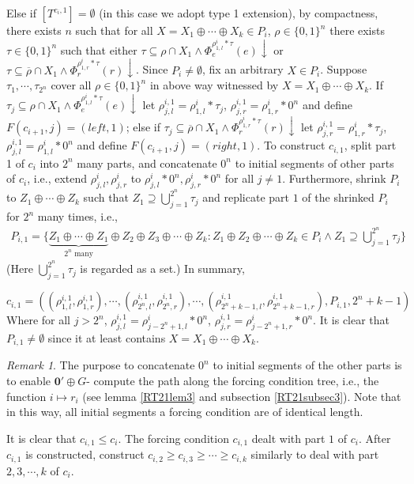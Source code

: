 \documentclass[options]{amsart}
\theoremstyle{definition}
\theoremstyle{remark}
\newtheorem{remark}[theorem]{Remark}
\newtheorem{Ramsey's theorem}[theorem]{Ramsey's theorem}
\begin{document}
Else if
$[T^{c_i,1}]=\emptyset$
(in this case we adopt type 1 extension),
by compactness, there exists
$n$ such that for all
$X= X_1\oplus\cdots\oplus
X_k\in P_i$,
$\rho\in \{0,1\}^n$ there exists
$\tau\in\{0,1\}^n$ such that
either $\tau\subseteq\rho\cap X_1\wedge
\Phi_e^{\rho^i_{1,l}*\tau}(e)\downarrow$ or $
\tau\subseteq \overline{\rho}\cap X_1\wedge
\Phi_r^{\rho^i_{1,r}*\tau}(r)\downarrow$.
Since $P_i\ne \emptyset$,
fix an arbitrary $X\in P_i$.
Suppose $\tau_1,\cdots, \tau_{2^n}$
cover all $\rho\in \{0,1\}^n$ in above way
witnessed by $X=X_1\oplus\cdots\oplus X_k$.
If $\tau_j\subseteq\rho\cap X_1\wedge
\Phi_e^{\rho^i_{1,l}*\tau}(e)\downarrow$
let $\rho^{i,1}_{j,l} =
\rho^i_{1,l}*\tau_j $,
$\rho^{i,1}_{j,r} =
\rho^i_{1,r}*0^n$
and define
$F(c_{i+1},j) =
(left, 1)$;
else if
$
\tau_j\subseteq \overline{\rho}\cap X_1\wedge
\Phi_r^{\rho^i_{1,r}*\tau}(r)\downarrow$
let $\rho^{i,1}_{j,r}
=\rho^i_{1,r}*\tau_j$,
$\rho^{i,1}_{j,l} =
\rho^i_{1,l}*0^n$
and define
$F(c_{i+1},j) =
(right, 1)$.
To construct $c_{i,1}$, split
part 1 of $c_i$ into
$2^n$ many parts, and concatenate
$0^n$ to
initial segments of other parts
of $c_i$, i.e.,
 extend $\rho^i_{j,l},\rho^i_{j,r}$
to $\rho^i_{j,l}*0^n, \rho^i_{j,r}*0^n$
for all $j\neq 1$.
Furthermore, shrink $P_i$
to $Z_1\oplus \cdots \oplus Z_k$ such
that $Z_1\supseteq \bigcup\limits_{j=1}
^{2^n}\tau_j$ and replicate
part $1$  of the shrinked
$P_i$ for $2^n$ many
times, i.e.,
\begin{align}
P_{i,1} = \{
\underbrace{Z_1\oplus\cdots
\oplus Z_1}\limits_{2^n\text{ many}}
\oplus Z_2\oplus Z_3\oplus\cdots
\oplus Z_k:
Z_1\oplus Z_2\oplus\cdots\oplus
Z_k\in P_i\wedge
Z_1\supseteq
\bigcup\limits_{j=1}^{2^n}
\tau_{j}
\}
\end{align}
(Here $\bigcup\limits_{j=1}^{2^n}
\tau_j$ is regarded as a set.)
In summary,

$$c_{i,1} =
((\rho^{i,1}_{1,l},
\rho^{i,1}_{1,r}),\cdots,
(\rho^{i,1}_{2^n,l},
\rho^{i,1}_{2^n,r}),
\cdots,(\rho^{i,1}_{2^n+k-1,l},
\rho^{i,1}_{2^n+k-1,r}),
P_{i,1}, 2^n+k-1)$$
Where for all $j>2^n$,
$\rho^{i,1}_{j,l}
=\rho^{i}_{j-2^n+1,l}*0^n$,
$\rho^{i,1}_{j,r}
=\rho^i_{j-2^n+1,r}*0^n$.
It is clear that
$P_{i,1}\ne\emptyset$
since it at least
contains $X=X_1\oplus\cdots\oplus
X_k$.

\begin{remark}
The purpose to concatenate
$0^n$ to  initial segments of the other
parts is to enable $\mathbf{0}'\oplus G$-
compute the path along the forcing condition
tree, i.e., the function $i\mapsto r_i$
(see lemma \ref{RT21lem3} and subsection \ref{RT21subsec3}).
Note that in this way, all initial segments a forcing condition
are of identical length.
\end{remark}
It is clear that
$c_{i,1}\leq c_i$.
The forcing condition
$c_{i,1}$ dealt with
part $1$ of $c_i$.
After
$c_{i,1}$ is constructed,
construct $c_{i,2}\geq
c_{i,3}\geq \cdots \geq
c_{i,k}$ similarly
to deal with part $2,3,\cdots,k$ of
$c_i$.
\end{document}
